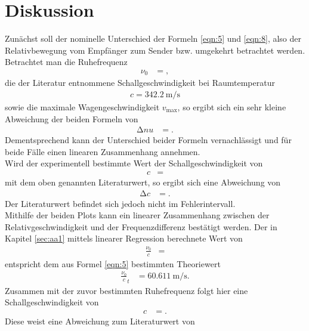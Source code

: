 \section{Diskussion}
\label{sec:Diskussion}
Zunächst soll der nominelle Unterschied der Formeln \ref{eqn:5} und \ref{eqn:8}, also der Relativbewegung vom Empfänger zum Sender bzw. umgekehrt betrachtet werden.
Betrachtet man die Ruhefrequenz
\begin{align*}
  \nu_0 &= ,
\end{align*}
die der Literatur \cite{bla} entnommene Schallgeschwindigkeit bei Raumtemperatur
\begin{align*}
  c = \SI{342.2}{\metre\per\second}
\end{align*}
sowie die maximale Wagengeschwindigkeit $v_{\text{max}}$, so ergibt sich ein sehr kleine Abweichung der beiden Formeln von
\begin{align*}
  \increment{nu} &= .
\end{align*}
Dementsprechend kann der Unterschied beider Formeln vernachlässigt und für beide Fälle einen linearen Zusammenhang annehmen.\\
Wird der experimentell bestimmte Wert der Schallgeschwindigkeit von
\begin{align*}
  c &= 
\end{align*}
mit dem oben genannten Literaturwert, so ergibt sich eine Abweichung von
\begin{align*}
  \increment{c} &= .
\end{align*}
Der Literaturwert befindet sich jedoch nicht im Fehlerintervall.\\
Mithilfe der beiden Plots kann ein linearer Zusammenhang zwischen der Relativgeschwindigkeit und der Frequenzdifferenz bestätigt werden.
Der in Kapitel \ref{sec:aa1} mittels linearer Regression berechnete Wert von
\begin{align*}
  \frac{\nu_0}{c} &= 
\end{align*}
entspricht dem aus Formel \ref{eqn:5} bestimmten Theoriewert
\begin{align*}
  \frac{\nu_0}{c}_t &= \SI{60.611}{\metre\per\second}.
\end{align*}
Zusammen mit der zuvor bestimmten Ruhefrequenz folgt hier eine Schallgeschwindigkeit von
\begin{align*}
  c &= .
\end{align*}
Diese weist eine Abweichung zum Literaturwert von
